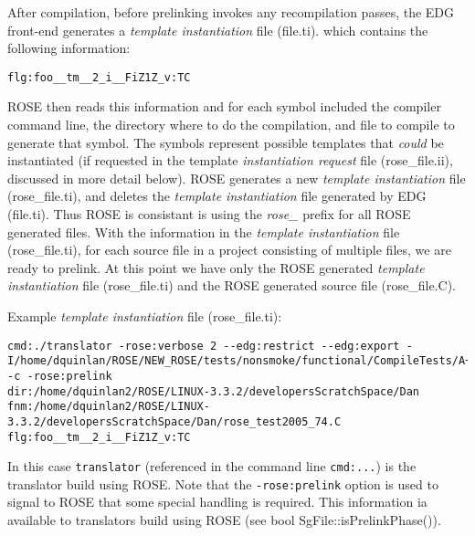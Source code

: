 {After compilation, before prelinking invokes any recompilation passes,
the EDG front-end generates a {\em template instantiation} file (file.ti).
which contains the following information:

{\indent
{\mySmallFontSize

\begin{verbatim}
flg:foo__tm__2_i__FiZ1Z_v:TC
\end{verbatim}
}}

ROSE then reads this information and for each symbol included the compiler command line,
the directory where to do the compilation, and file to compile to generate that symbol.
The symbols represent possible templates that {\em could} be instantiated (if requested 
in the template {\em instantiation request} file (rose\_file.ii), discussed in more 
detail below).  ROSE generates a new {\em template instantiation} file (rose\_file.ti),
and deletes the {\em template instantiation} file generated by EDG (file.ti).  Thus ROSE
is consistant is using the {\em rose\_} prefix for all ROSE generated files.  With
the information in the {\em template instantiation} file (rose\_file.ti), for each source
file in a project consisting of multiple files, we are ready to prelink.  At this point
we have only the ROSE generated {\em template instantiation} file (rose\_file.ti) and the
ROSE generated source file (rose\_file.C).

Example {\em template instantiation} file (rose\_file.ti):

{\indent
{\mySmallFontSize

\begin{verbatim}
cmd:./translator -rose:verbose 2 --edg:restrict --edg:export -I/home/dquinlan/ROSE/NEW_ROSE/tests/nonsmoke/functional/CompileTests/A++Code -c -rose:prelink
dir:/home/dquinlan2/ROSE/LINUX-3.3.2/developersScratchSpace/Dan
fnm:/home/dquinlan2/ROSE/LINUX-3.3.2/developersScratchSpace/Dan/rose_test2005_74.C
flg:foo__tm__2_i__FiZ1Z_v:TC
\end{verbatim}
}}

In this case {\tt translator} (referenced in the command line {\tt cmd:...}) is the 
translator build using ROSE. Note that the {\tt -rose:prelink} option is used to signal 
to ROSE that some special handling is required.  This information ia available to
translators build using ROSE (see bool SgFile::isPrelinkPhase()).

}
